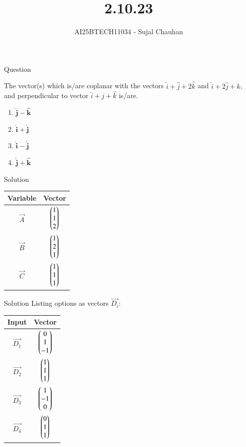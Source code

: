 \documentclass{beamer}
\title
{2.10.23}
\author 
{AI25BTECH11034 - Sujal Chauhan }
\begin{document}
\frame{\titlepage}
\begin{frame}{Question}

The vector(s) which is/are coplanar with the vectors $\hat{i}+\hat{j}+2\hat{k}$ and $\hat{i}+2\hat{j}+\hat{k}$, and perpendicular to vector $\hat{i}+\hat{j}+\hat{k}$ is/are.
\begin{enumerate}
    \item $\hat{\mathbf{j}} - \hat{\mathbf{k}}$
    \item $\hat{\mathbf{i}} + \hat{\mathbf{j}}$
    \item $\hat{\mathbf{i}} - \hat{\mathbf{j}}$
    \item $\hat{\mathbf{j}} + \hat{\mathbf{k}}$
\end{enumerate}
\end{frame}


\begin{frame}{Solution}
\begin{center}
\begin{tabular}{|c|c|}
\hline
Variable & Vector \\ \hline
$\vec{A}$ & $\begin{pmatrix}1 \\ 1 \\ 2\end{pmatrix}$ \\ \hline
$\vec{B}$ & $\begin{pmatrix}1 \\ 2 \\ 1\end{pmatrix}$ \\ \hline
$\vec{C}$ & $\begin{pmatrix}1 \\ 1 \\ 1\end{pmatrix}$ \\ \hline
\end{tabular}
\end{center}
\end{frame}
\begin{frame}{Solution}
Listing options as vectors $\vec{D_i}$:

\begin{center}
\begin{tabular}{|c|c|}
\hline
Input & Vector \\ \hline
$\vec{D_1}$ & $\begin{pmatrix}0 \\ 1 \\ -1\end{pmatrix}$ \\ \hline
$\vec{D_2}$ & $\begin{pmatrix}1 \\ 1 \\ 1\end{pmatrix}$ \\ \hline
$\vec{D_3}$ & $\begin{pmatrix}1 \\ -1 \\ 0\end{pmatrix}$ \\ \hline
$\vec{D_4}$ & $\begin{pmatrix}0 \\ 1 \\ 1\end{pmatrix}$ \\ \hline
\end{tabular}
\end{center}
\end{frame}
\end{document}
